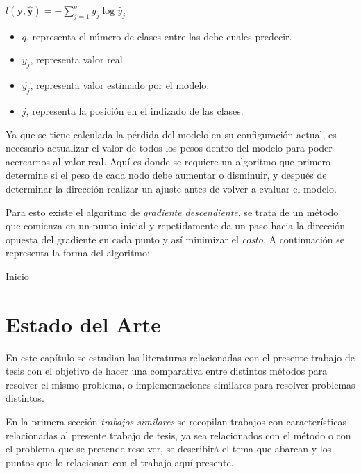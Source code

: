 $l(\mathbf{y}, \hat{\mathbf{y}}) = - \sum_{j=1}^q y_j \log \hat{y}_j$ 

\begin{itemize}
    \item $q$, representa el número de clases entre las debe cuales predecir.
    \item $y_j$, representa valor real.
    \item $\hat{y_j}$, representa valor estimado por el modelo.
    \item $j$, representa la posición en el indizado de las clases.
\end{itemize}

Ya que se tiene calculada la pérdida del modelo en su configuración actual, es necesario actualizar el valor de todos los pesos dentro del modelo para poder acercarnos al valor real. Aquí es donde se requiere un algoritmo que primero determine si el peso de cada nodo debe aumentar o disminuir, y después de determinar la dirección realizar un ajuste antes de volver a evaluar el modelo.

\newpage

Para esto existe el algoritmo de \emph{gradiente descendiente}, se trata de un método que comienza en un punto inicial y repetidamente da un paso hacia la dirección opuesta del gradiente en cada punto y así minimizar el \emph{costo}. A continuación se representa la forma del algoritmo:

\begin{algorithm}[H]    
     Inicio\;
\end{algorithm}

\chapter{Estado del Arte}
En este capítulo se estudian las literaturas relacionadas con el presente trabajo de tesis con el objetivo de hacer una comparativa entre distintos métodos para resolver el mismo problema, o implementaciones similares para resolver problemas distintos.

En la primera sección \emph{trabajos similares} se recopilan trabajos con características relacionadas al presente trabajo de tesis, ya sea relacionados con el método o con el problema que se pretende resolver, se describirá el tema que abarcan y los puntos que lo relacionan con el trabajo aquí presente. 

